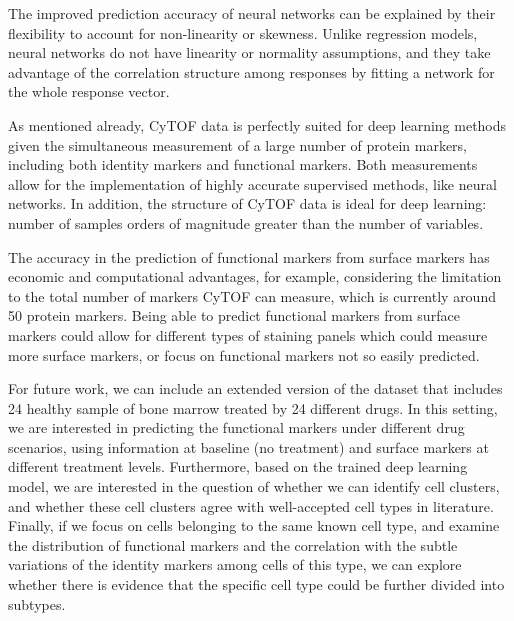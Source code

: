 \documentclass[graybox]{svmult}
\begin{document}
The improved prediction accuracy of neural networks can be explained
by their flexibility to account for non-linearity or skewness.  Unlike
regression models, neural networks do not have linearity or normality
assumptions, and they take advantage of the correlation structure
among responses by fitting a network for the whole response vector.

As mentioned already, CyTOF data is perfectly suited for deep learning
methods given the simultaneous measurement of a large number of
protein markers, including both identity markers and functional
markers. Both measurements allow for the implementation of highly
accurate supervised methods, like neural networks. In addition, the
structure of CyTOF data is ideal for deep learning: number of samples
orders of magnitude greater than the number of variables.

The accuracy in the prediction of functional markers from surface markers has economic and computational advantages, for example, considering the limitation to the total number of markers CyTOF can measure, which is currently around 50 protein markers. Being able to predict functional markers from surface markers could allow for different types of staining panels which could measure more surface markers, or focus on functional markers not so easily predicted.


For future work, we can include an extended version of the
dataset\cite{Bendall2011,Qiu2011} that includes 24 healthy sample of
bone marrow treated by 24 different drugs. In this setting, we are
interested in predicting the functional markers under different drug
scenarios, using information at baseline (no treatment) and surface
markers at different treatment levels.
Furthermore, based on the trained deep learning model, we are
interested in the question of whether we can identify cell clusters,
and whether these cell clusters agree with well-accepted cell types in
literature.
Finally, if we focus on cells belonging to the same known cell type, and
examine the distribution of functional markers and the correlation
with the subtle variations of the identity markers among cells of this
type, we can explore whether there is evidence that the specific cell
type could be further divided into subtypes.









\end{document}
